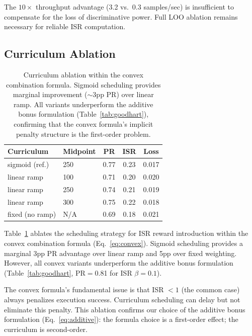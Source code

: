 \documentclass[11pt,a4paper]{article}
\begin{document}
The $10\times$ throughput advantage (3.2 vs.\ 0.3 samples/sec) is insufficient to compensate for the loss of discriminative power.
Full LOO ablation remains necessary for reliable ISR computation.

\subsection{Curriculum Ablation}
\label{sec:curriculum}

\begin{table}[t]
\centering
\small
\begin{tabular}{llccc}
\toprule
\textbf{Curriculum} & \textbf{Midpoint} & \textbf{PR} & \textbf{ISR} & \textbf{Loss} \\
\midrule
sigmoid (ref.) & 250 & 0.77 & 0.23 & 0.017 \\
linear ramp & 100 & 0.71 & 0.20 & 0.020 \\
linear ramp & 250 & 0.74 & 0.21 & 0.019 \\
linear ramp & 300 & 0.75 & 0.22 & 0.018 \\
fixed (no ramp) & N/A & 0.69 & 0.18 & 0.021 \\
\bottomrule
\end{tabular}
\caption{Curriculum ablation within the convex combination formula. Sigmoid scheduling provides marginal improvement (${\sim}$3pp PR) over linear ramp. All variants underperform the additive bonus formulation (Table~\ref{tab:goodhart}), confirming that the convex formula's implicit penalty structure is the first-order problem.}
\label{tab:curriculum}
\end{table}

Table~\ref{tab:curriculum} ablates the scheduling strategy for ISR reward introduction within the convex combination formula (Eq.~\ref{eq:convex}).
Sigmoid scheduling provides a marginal 3pp PR advantage over linear ramp and 5pp over fixed weighting.
However, all convex variants underperform the additive bonus formulation (Table~\ref{tab:goodhart}, PR$=$0.81 for ISR $\beta{=}0.1$).

The convex formula's fundamental issue is that ISR $< 1$ (the common case) always penalizes execution success.
Curriculum scheduling can delay but not eliminate this penalty.
This ablation confirms our choice of the additive bonus formulation (Eq.~\ref{eq:additive}): the formula choice is a first-order effect; the curriculum is second-order.
\end{document}
